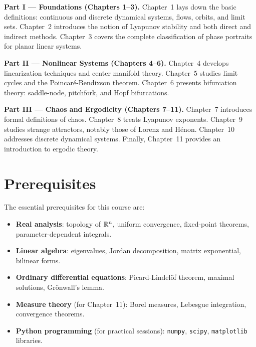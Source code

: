\medskip

\noindent\textbf{Part I --- Foundations (Chapters 1--3).}
Chapter~1 lays down the basic definitions: continuous and discrete dynamical
systems, flows, orbits, and limit sets. Chapter~2 introduces the notion of
Lyapunov stability and both direct and indirect methods. Chapter~3 covers
the complete classification of phase portraits for planar linear systems.

\medskip

\noindent\textbf{Part II --- Nonlinear Systems (Chapters 4--6).}
Chapter~4 develops linearization techniques and center manifold theory.
Chapter~5 studies limit cycles and the Poincar\'e-Bendixson theorem.
Chapter~6 presents bifurcation theory: saddle-node, pitchfork, and Hopf
bifurcations.

\medskip

\noindent\textbf{Part III --- Chaos and Ergodicity (Chapters 7--11).}
Chapter~7 introduces formal definitions of chaos. Chapter~8 treats Lyapunov
exponents. Chapter~9 studies strange attractors, notably those of Lorenz
and H\'enon. Chapter~10 addresses discrete dynamical systems. Finally,
Chapter~11 provides an introduction to ergodic theory.

\section*{Prerequisites}

The essential prerequisites for this course are:

\begin{itemize}
    \item \textbf{Real analysis}: topology of $\mathbb{R}^n$, uniform convergence,
    fixed-point theorems, parameter-dependent integrals.

    \item \textbf{Linear algebra}: eigenvalues, Jordan decomposition,
    matrix exponential, bilinear forms.

    \item \textbf{Ordinary differential equations}: Picard-Lindel\"of theorem,
    maximal solutions, Gr\"onwall's lemma.

    \item \textbf{Measure theory} (for Chapter~11): Borel measures,
    Lebesgue integration, convergence theorems.

    \item \textbf{Python programming} (for practical sessions): \texttt{numpy},
    \texttt{scipy}, \texttt{matplotlib} libraries.
\end{itemize}

